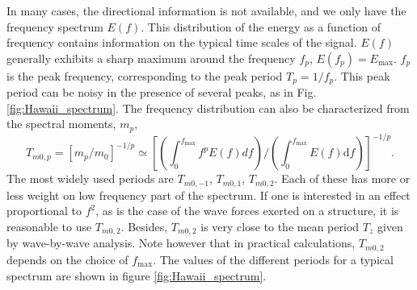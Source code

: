 In many cases, the directional information is not available, and we only have the frequency spectrum $E(f)$. 
This distribution of the energy as a function of frequency contains information on the typical time scales of the signal. $E(f)$ generally exhibits 
a sharp maximum around the frequency $f_p$, $E(f_{p})=E_{\max}$. $f_p$ is the peak frequency, corresponding to the peak period $T_{p}=1/f_p$.  
This peak period can be noisy in the presence of several peaks, as in Fig. \ref{fig:Hawaii_spectrum}.
The frequency distribution can also be characterized from the spectral moments, $m_p$, 
\begin{equation}
T_{m0,p} =  \left[m_p/m_0\right]^{-1/p} \simeq \left[\left(\int_{0}^{f_{\max}} f^{p} E(f) df\right)/\left({\int_{0}^{f_{\max}} E(f) {\mathrm d}f}\right)\right]^{-1/p}.
\label{eq3.17}
\end{equation}
The most widely used periods are $T_{m0,-1}$, $T_{m0,1}$, $T_{m0,2}$. Each of these has more or less weight on low frequency part of the spectrum.
If one is interested in an effect proportional to $f^2$, as is  the case of the wave forces exerted on a structure, it is reasonable to use $T_{m0,2}$.
Besides, $T_{m0,2}$ is very close to the mean period $T_z$ given by  wave-by-wave analysis. Note however that in practical calculations, $T_{m0,2}$ depends on the choice
of $f_{\max}$. The values of the different periods for a typical spectrum are shown in figure 
\ref{fig:Hawaii_spectrum}.
